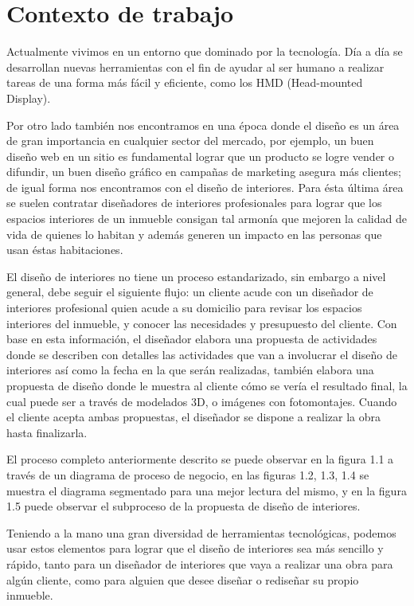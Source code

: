 \section{Contexto de trabajo}

Actualmente vivimos en un entorno que dominado por la tecnología. Día a día se desarrollan nuevas herramientas con el fin de ayudar al ser humano a realizar tareas de una forma más fácil y eficiente, como los HMD (Head-mounted Display)\cite{B15}.


Por otro lado también nos encontramos en una época donde el diseño es un área de gran importancia en cualquier sector del mercado, por ejemplo, un buen diseño web en un sitio es fundamental lograr que un producto se logre vender o difundir, un buen diseño gráfico en campañas de marketing asegura más clientes; de igual forma nos encontramos con el diseño de interiores. Para ésta última área se suelen contratar diseñadores de interiores profesionales para lograr que los espacios interiores de un inmueble consigan tal armonía que mejoren la calidad de vida de quienes lo habitan y además generen un impacto en las personas que usan éstas habitaciones.\par
El diseño de interiores no tiene un proceso estandarizado, sin embargo a nivel general, debe seguir el siguiente flujo: un cliente acude con un diseñador de interiores profesional quien acude a su domicilio para revisar los espacios interiores del inmueble, y conocer las necesidades y presupuesto del cliente. Con base en esta información, el diseñador elabora una propuesta de actividades donde se describen con detalles las actividades que van a involucrar el diseño de interiores así como la fecha en la que serán realizadas, también elabora una propuesta de diseño donde le muestra al cliente cómo se vería el resultado final, la cual puede ser a través de modelados 3D, o imágenes con fotomontajes. Cuando el cliente acepta ambas propuestas, el diseñador se dispone a realizar la obra hasta finalizarla.\par
El proceso completo anteriormente descrito se puede observar en la figura 1.1 a través de un diagrama de proceso de negocio, en las figuras 1.2, 1.3, 1.4 se muestra el diagrama segmentado para una mejor lectura del mismo, y en la figura 1.5 puede observar el subproceso de la propuesta de diseño de interiores.\par
Teniendo a la mano una gran diversidad de herramientas tecnológicas, podemos usar estos elementos para lograr que el diseño de interiores sea más sencillo y rápido, tanto para un diseñador de interiores que vaya a realizar una obra para algún cliente, como para alguien que desee diseñar o rediseñar su propio inmueble.
\newpage

